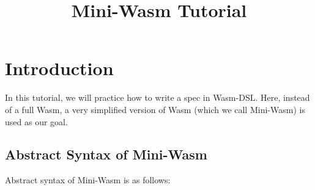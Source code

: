 \documentclass{article}
\date{}
\newcommand\X[1]{\mathit{#1}}
\newcommand\K[1]{\texttt{#1}}
\begin{document}
\title{Mini-Wasm Tutorial}
\maketitle

\section{Introduction}
In this tutorial, we will practice how to write a spec in Wasm-DSL.
Here, instead of a full Wasm, a very simplified version of Wasm (which we call Mini-Wasm) is used as our goal.

\subsection{Abstract Syntax of Mini-Wasm}
Abstract syntax of Mini-Wasm is as follows:
\end{document}
